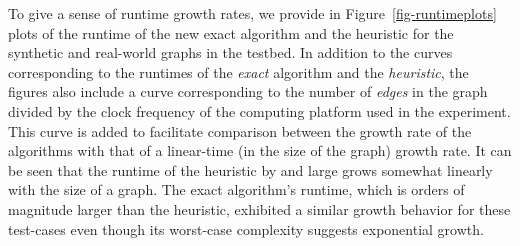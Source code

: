 To give a sense of runtime growth rates, we provide in Figure~\ref{fig-runtimeplots} plots of the 
runtime of the new exact algorithm and the heuristic for the synthetic and real-world graphs 
in the testbed. In addition to the curves corresponding to the runtimes of the
{\em exact} algorithm and the {\em heuristic}, the figures also include a curve corresponding to
the number of {\em edges} in the graph divided by the clock frequency of the computing
platform used in the experiment. This curve is added to facilitate comparison between
the growth rate of the algorithms with that of a linear-time (in the size of the graph) growth rate. 
It can be seen that the runtime of the heuristic by and large grows 
somewhat linearly with the size of a graph. The exact algorithm's runtime, which is orders of
magnitude larger than the heuristic, exhibited a similar growth behavior for these test-cases
even though its worst-case complexity suggests exponential growth. 



